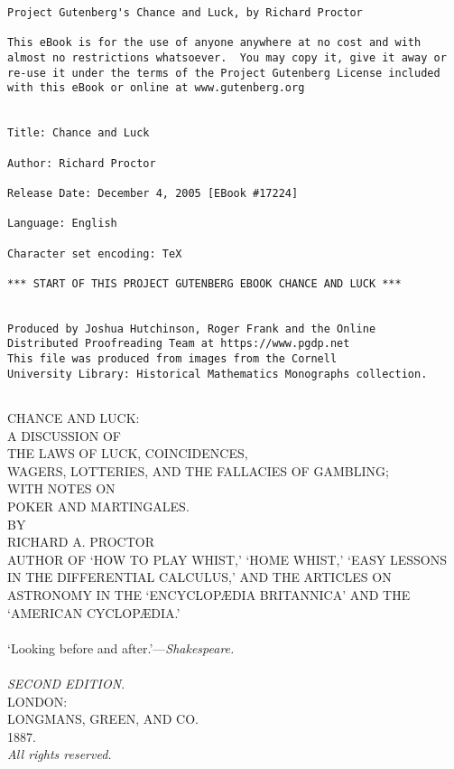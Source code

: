 \documentclass[letterpaper,12pt,oneside,openany]{memoir}
\begin{document}
\thispagestyle{empty}
\small
\begin{verbatim}
Project Gutenberg's Chance and Luck, by Richard Proctor

This eBook is for the use of anyone anywhere at no cost and with
almost no restrictions whatsoever.  You may copy it, give it away or
re-use it under the terms of the Project Gutenberg License included
with this eBook or online at www.gutenberg.org


Title: Chance and Luck

Author: Richard Proctor

Release Date: December 4, 2005 [EBook #17224]

Language: English

Character set encoding: TeX

*** START OF THIS PROJECT GUTENBERG EBOOK CHANCE AND LUCK ***


Produced by Joshua Hutchinson, Roger Frank and the Online
Distributed Proofreading Team at https://www.pgdp.net
This file was produced from images from the Cornell
University Library: Historical Mathematics Monographs collection.


\end{verbatim}
\normalsize
\newpage

\pagestyle{empty}

\begin{titlingpage}
\begin{center}
\vspace*{1cm}
{\Huge CHANCE AND LUCK:}\\
\bigskip
{\small A DISCUSSION OF}\\
\medskip
{\large THE LAWS OF LUCK, COINCIDENCES,\\
WAGERS, LOTTERIES, AND THE FALLACIES OF GAMBLING;}\\
\bigskip
{\small WITH NOTES ON}\\
\medskip
{\large POKER AND MARTINGALES.}\\
\vspace*{2cm}
{\small BY}\\
\smallskip
{\large RICHARD A. PROCTOR}\\
\bigskip
{\tiny AUTHOR OF `HOW TO PLAY WHIST,' `HOME WHIST,'
`EASY LESSONS IN THE DIFFERENTIAL CALCULUS,'
AND THE ARTICLES ON ASTRONOMY IN THE `ENCYCLOP{\AE}DIA BRITANNICA'
AND THE `AMERICAN CYCLOP{\AE}DIA.'}\\
\vspace*{2cm}
\makebox[1in]{\hrulefill}\\
\smallskip
`Looking before and after.'---\textit{Shakespeare.}\\
\makebox[1in]{\hrulefill}\\
\vspace*{2cm}
\textit{SECOND EDITION}.\\
\bigskip
{\large LONDON:\\
LONGMANS, GREEN, AND CO.\\
1887.}\\
\medskip
{\small \emph{All rights reserved.}}
\end{center}
\end{titlingpage}
\end{document}
